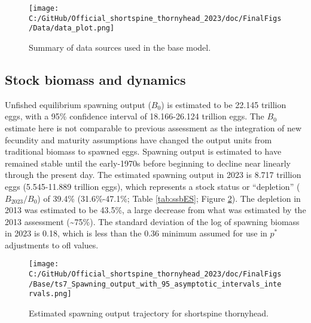 \documentclass[11pt,
  letterpaper,
]{article}
\begin{document}
\begin{figure}
\centering
\texttt{[image: C:/GitHub/Official\_shortspine\_thornyhead\_2023/doc/FinalFigs/Data/data\_plot.png]}
\caption{Summary of data sources used in the base model.\label{fig:assessment_data_timeseriesES}}
\end{figure}

\hypertarget{stock-biomass-and-dynamics}{%
\subsection*{Stock biomass and dynamics}\label{stock-biomass-and-dynamics}}

Unfished equilibrium spawning output (\(B_0\)) is estimated to be 22.145 trillion eggs, with a 95\% confidence interval of 18.166-26.124 trillion eggs. The \(B_0\) estimate here is not comparable to previous assessment as the integration of new fecundity and maturity assumptions have changed the output units from traditional biomass to spawned eggs. Spawning output is estimated to have remained stable until the early-1970s before beginning to decline near linearly through the present day. The estimated spawning output in 2023 is 8.717 trillion eggs (5.545-11.889 trillion eggs), which represents a stock status or ``depletion'' (\(B_{2023}/B_0\)) of 39.4\% (31.6\%-47.1\%; Table \ref{tab:ssbES}; Figure \ref{fig:ssb_trajectoryES}). The depletion in 2013 was estimated to be 43.5\%, a large decrease from what was estimated by the 2013 assessment (\textasciitilde75\%). The standard deviation of the log of spawning biomass in 2023 is 0.18, which is less than the 0.36 minimum assumed for use in \(p^*\) adjustments to \gls{ofl} values.

\begin{figure}
\centering
\texttt{[image: C:/GitHub/Official\_shortspine\_thornyhead\_2023/doc/FinalFigs/Base/ts7\_Spawning\_output\_with\_95\_asymptotic\_intervals\_intervals.png]}
\caption{Estimated spawning output trajectory for shortspine thornyhead.\label{fig:ssb_trajectoryES}}
\end{figure}

\begingroup\fontsize{10}{12}\selectfont
\begingroup\fontsize{10}{12}\selectfont
\end{document}
